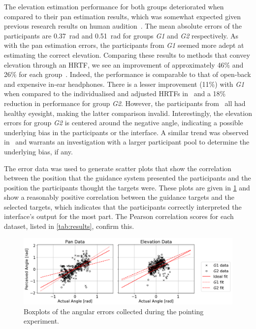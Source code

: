 \documentclass{llncs}
\begin{document}
The elevation estimation performance for both groups deteriorated when compared to their pan estimation results, which was somewhat expected given previous research results on human audition~\cite{barfield1997visual}. 
The mean absolute errors of the participants are \SI{0.37}{\radian} and \SI{0.51}{\radian} for groups \textit{G1} and \textit{G2} respectively.
As with the pan estimation errors, the participants from \textit{G1} seemed more adept at estimating the correct elevation.
Comparing these results to methods that convey elevation through an HRTF, we see an improvement of approximately 46\% and 26\% for each group~\cite{schonstein2008comparison}. 
Indeed, the performance is comparable to that of open-back and expensive in-ear headphones.
There is a lesser improvement (11\%) with \textit{G1} when compared to the individualised and adjusted HRTFs in~\cite{stanley2006lateralization} and a 18\% reduction in performance for group \textit{G2}.
However, the participants from~\cite{stanley2006lateralization} all had healthy eyesight, making the latter comparison invalid. 
Interestingly, the elevation errors for group \textit{G2} is centered around the negative angle, indicating a possible underlying bias in the participants or the interface.
A similar trend was observed in~\cite{stanley2006lateralization} and warrants an investigation with a larger participant pool to determine the underlying bias, if any. 

The error data was used to generate scatter plots that show the correlation between the position that the guidance system presented the participants and the position the participants thought the targets were.
These plots are given in \cref{fig:correlation-results} and show a reasonably positive correlation between the guidance targets and the selected targets, which indicates that the participants correctly interpreted the interface's output for the most part. 
The Pearson correlation scores for each dataset, listed in \cref{tab:results}, confirm this.

\begin{figure}[t]
  \centering
  \includegraphics[width=1.0\columnwidth]{figures/correlation.png}
  \caption{Boxplots of the angular errors collected during the pointing experiment. }\label{fig:correlation-results}
\end{figure}
\end{document}
